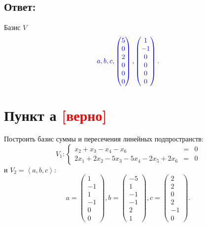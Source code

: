 \documentclass[12pt]{article}
\begin{document}
    \subsection*{Ответ:}
    Базис $V$
    \[
        \color{blue}
        a, b, c ,
        \begin{pmatrix}
            5 \\ 0 \\ 2 \\ 0 \\ 0 \\ 0
        \end{pmatrix} ,
        \begin{pmatrix}
            1 \\ -1 \\ 0 \\ 0 \\ 0 \\ 0
        \end{pmatrix} .
    \]

    \section*{Пункт а \textcolor{red}{[верно]}}
    Построить базис суммы и пересечения линейных подпространств:
    \[
        V_1 :
        \left \{
        \begin{array}{rcl}
            x_2 + x_3 - x_4 - x_6                         & = & 0 \\
            2 x_1 + 2 x_2 - 5 x_3 - 5 x_4 - 2 x_5 + 2 x_6 & = & 0
        \end{array}
        \right .
    \]
    и $V_2 = \left < a, b, c \right >$:
    \[
        a =
        \begin{pmatrix}
            1 \\ -1 \\ 1 \\ -1 \\ 0 \\ 0
        \end{pmatrix},
        b =
        \begin{pmatrix}
            -5 \\ 1 \\ -1 \\ -1 \\ 2 \\ 1
        \end{pmatrix},
        c =
        \begin{pmatrix}
            2 \\ 2 \\ 0 \\ 2 \\ -1 \\ 0
        \end{pmatrix} .
    \]
\end{document}
